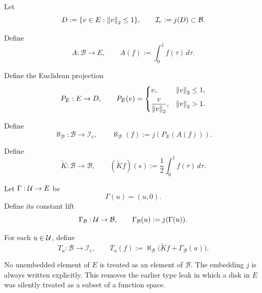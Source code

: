 \begin{definition}
Let
\[
D:=\{v\in E:\left\lVert v \right\rVert_2\le 1\},
\qquad
\mathcal{I}_{\mathrm{c}}:=j(D)\subset \mathcal{B}.
\]
\end{definition}

\begin{definition}
Define
\[
A:\mathcal{B}\to E,
\qquad
A(f):=\int_0^1 f(\tau)\,d\tau.
\]
\end{definition}

\begin{definition}
Define the Euclidean projection
\[
P_E:E\to D,
\qquad
P_E(v)=
\begin{cases}
v, & \left\lVert v \right\rVert_2\le 1,\\[0.4em]
\dfrac{v}{\left\lVert v \right\rVert_2}, & \left\lVert v \right\rVert_2>1.
\end{cases}
\]
\end{definition}

\begin{definition}
Define
\[
\aleph_{\mathcal B}:\mathcal{B}\to \mathcal{I}_{\mathrm{c}},
\qquad
\aleph_{\mathcal B}(f):=j(P_E(A(f))).
\]
\end{definition}

\begin{definition}
Define
\[
\widetilde K:\mathcal{B}\to\mathcal{B},
\qquad
(\widetilde K f)(s):=\frac{1}{2}\int_0^1 f(\tau)\,d\tau.
\]
\end{definition}

\begin{definition}
Let $\Gamma:\mathcal{U}\to E$ be
\[
\Gamma(u)=(u,0).
\]
Define its constant lift
\[
\Gamma_{\mathcal B}:\mathcal{U}\to \mathcal{B},
\qquad
\Gamma_{\mathcal B}(u):=j(\Gamma(u)).
\]
\end{definition}

\begin{definition}
For each $u\in\mathcal{U}$, define
\[
T_u:\mathcal{B}\to \mathcal{I}_{\mathrm{c}},
\qquad
T_u(f):=\aleph_{\mathcal B}\bigl(\widetilde K f+\Gamma_{\mathcal B}(u)\bigr).
\]
\end{definition}

\begin{remark}
No unembedded element of $E$ is treated as an element of $\mathcal{B}$. The embedding $j$ is always written explicitly. This removes the earlier type leak in which a disk in $E$ was silently treated as a subset of a function space.
\end{remark}

